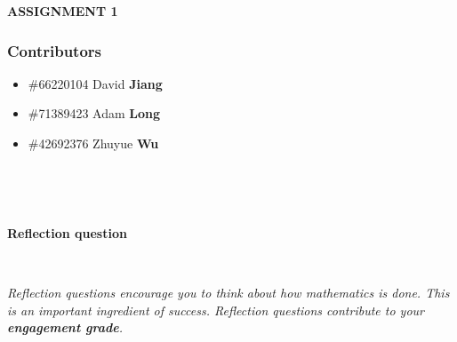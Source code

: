 \documentclass{exam}
\begin{document}
\large{\textbf{ASSIGNMENT 1}}

\normalsize




\subsubsection*{Contributors}


\begin{itemize}
    \item \#66220104 David {\bf Jiang} 
    \item \#71389423 Adam {\bf Long}
    \item \#42692376 Zhuyue {\bf Wu}
\end{itemize}

\

\hrulefill

\

\textbf{Reflection question}

\

\textit{Reflection questions encourage you to think about how mathematics is done. This is an important ingredient of success. Reflection questions contribute to your \textbf{engagement grade}.}
\end{document}

